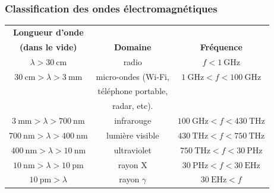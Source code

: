 \documentclass{article}
\begin{document}
            \subsubsection{Classification des ondes électromagnétiques}
            \begin{table}[H]
                \centering
            \begin{tabular}{c|c|c}
                \textbf{Longueur d'onde} & & \\
                \textbf{(dans le vide)} & \textbf{Domaine} & \textbf{Fréquence}\\
                \hline
                $\lambda > \SI{30}{\centi\metre}$ & radio & $f < \SI{1}{\giga\hertz}$\\
                \hline
                $\SI{30}{\centi\meter} > \lambda > \SI{3}{\milli\meter}$ & micro-ondes (Wi-Fi, & $\SI{1}{\giga\hertz} < f < \SI{100}{\giga\hertz}$\\
                & téléphone portable, & \\
                & radar, etc). & \\
                \hline
                $\SI{3}{\milli\meter} > \lambda > \SI{700}{\nano\meter}$ & infrarouge & $\SI{100}{\giga\hertz} < f < \SI{430}{\tera\hertz}$\\
                \hline
                $\SI{700}{\nano\meter} > \lambda > \SI{400}{\nano\meter}$ & lumière visible & $\SI{430}{\tera\hertz} < f < \SI{750}{\tera\hertz}$\\
                \hline
                $\SI{400}{\nano\meter} > \lambda > \SI{10}{\nano\meter}$ & ultraviolet & $\SI{750}{\tera\hertz} < f < \SI{30}{\peta\hertz}$\\
                \hline
                $\SI{10}{\nano\meter} > \lambda > \SI{10}{\pico\meter}$ & rayon X & $\SI{30}{\peta\hertz} < f < \SI{30}{\exa\hertz}$\\
                \hline
                $\SI{10}{\pico\meter} > \lambda$ & rayon $\gamma$ & $\SI{30}{\exa\hertz} < f$\\
            \end{tabular}
            \end{table}
\end{document}
